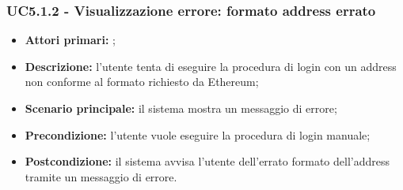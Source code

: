 \subsubsection{UC5.1.2 - Visualizzazione errore: formato address errato}
\begin{itemize}
	\item \textbf{Attori primari:} \una{};
	\item \textbf{Descrizione:} l’utente tenta di eseguire la procedura di login con un address non conforme al formato richiesto da Ethereum;
	\item \textbf{Scenario principale:} il sistema mostra un messaggio di errore; 
	\item \textbf{Precondizione:} l’utente vuole eseguire la procedura di login manuale;
	\item \textbf{Postcondizione:} il sistema avvisa l’utente dell’errato formato dell’address tramite un messaggio di errore.
\end{itemize}